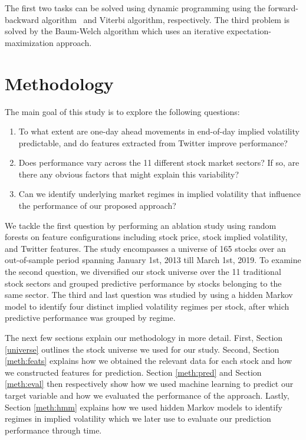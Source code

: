 \documentclass[preprint,1p, times,authoryear]{elsarticle}
\begin{document}
The first two tasks can be solved using dynamic programming using the forward-backward algorithm~\citep{fwdback} and Viterbi \citep{viterbi} algorithm, respectively. The third problem is solved by the Baum-Welch algorithm \citep{baumwelch} which uses an iterative expectation-maximization approach.


\section{Methodology}

The main goal of this study is to explore the following questions:
\begin{enumerate}[noitemsep]
    \item To what extent are one-day ahead movements in end-of-day implied volatility predictable, and do features extracted from Twitter improve performance?
    \item Does performance vary across the 11 different stock market sectors? If so, are there any obvious factors that might explain this variability?
    \item Can we identify underlying market regimes in implied volatility that influence the performance of our proposed approach?
\end{enumerate}

We tackle the first question by performing an ablation study using random forests on feature configurations including stock price, stock implied volatility, and Twitter features. The study encompasses a universe of 165 stocks over an out-of-sample period spanning January 1st, 2013 till March 1st, 2019. To examine the second question, we diversified our stock universe over the 11 traditional stock sectors and grouped predictive performance by stocks belonging to the same sector. The third and last question was studied by using a hidden Markov model to identify four distinct implied volatility regimes per stock, after which predictive performance was grouped by regime. 

The next few sections explain our methodology in more detail. First, Section \ref{universe} outlines the stock universe we used for our study. Second, Section \ref{meth:feats} explains how we obtained the relevant data for each stock and how we constructed features for prediction. Section \ref{meth:pred} and Section \ref{meth:eval} then respectively show how we used machine learning to predict our target variable and how we evaluated the performance of the approach. Lastly, Section \ref{meth:hmm} explains how we used hidden Markov models to identify regimes in implied volatility which we later use to evaluate our prediction performance through time. 
\end{document}
